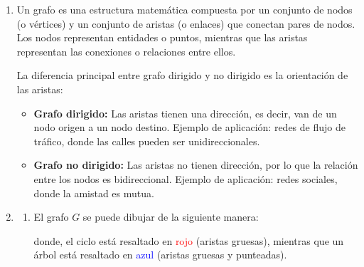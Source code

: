 \documentclass[12pt]{article}
\begin{document}
        \begin{enumerate}
            \item Un grafo es una estructura matemática compuesta por un conjunto de nodos (o vértices) y un conjunto de aristas (o enlaces) que conectan pares de nodos. Los nodos representan entidades o puntos, mientras que las aristas representan las conexiones o relaciones entre ellos.

            La diferencia principal entre grafo dirigido y no dirigido es la orientación de las aristas:
            \begin{itemize}
                \item \textbf{Grafo dirigido:} Las aristas tienen una dirección, es decir, van de un nodo origen a un nodo destino. Ejemplo de aplicación: redes de flujo de tráfico, donde las calles pueden ser unidireccionales.
                \item \textbf{Grafo no dirigido:} Las aristas no tienen dirección, por lo que la relación entre los nodos es bidireccional. Ejemplo de aplicación: redes sociales, donde la amistad es mutua.
            \end{itemize}

            \item 
            \begin{enumerate}[label=\alph*)]
                \item El grafo $G$ se puede dibujar de la siguiente manera:

                \begin{center}
                \end{center}
                donde, el ciclo está resaltado en \textcolor{red}{rojo} (aristas gruesas), mientras que un árbol está resaltado en \textcolor{blue}{azul} (aristas gruesas y punteadas).


\end{enumerate}
\end{enumerate}
\end{document}
